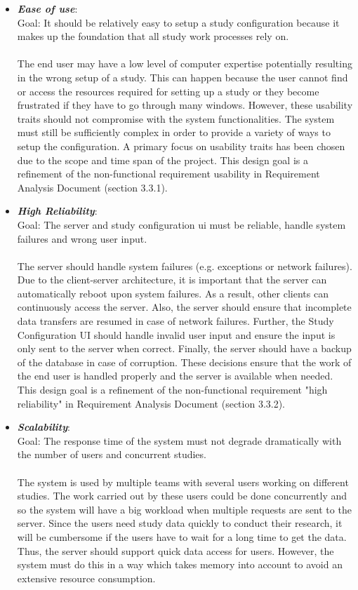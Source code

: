 \begin{itemize}
\item \textit{\bf{Ease of use}}: 
\\
Goal: It should be relatively easy to setup a study configuration because it makes up the foundation that all study work processes rely on. 
\\\\
The end user may have a low level of computer expertise potentially resulting in the wrong setup of a study.  This can happen because the user cannot find or access the resources required for setting up a study or they become frustrated if they have to go through many windows. However, these usability traits should not compromise with the system functionalities. The system must still be sufficiently complex in order to provide a variety of ways to setup the configuration.  A primary focus on usability traits has been chosen due to the scope and time span of the project. This design goal is a refinement of the non-functional requirement  usability in Requirement Analysis Document  (section 3.3.1). 

\item \textit{\bf{High Reliability}}: 
\\
Goal: The server and study configuration ui must be reliable, handle system failures and wrong user input.
\\\\
The server should handle system failures (e.g. exceptions or network failures). Due to the client-server architecture, it is important that the server can automatically reboot upon system failures. As a result, other clients can continuously access the server. Also, the server should ensure that incomplete data transfers are resumed in case of network failures. Further, the Study Configuration UI should handle invalid user input and ensure the input is only sent to the server when correct. Finally, the server should have a backup of the database in case of corruption. These decisions ensure that the work of the end user is handled properly and the server is available when needed. This design goal is a refinement of the non-functional requirement "high reliability" in Requirement Analysis Document (section 3.3.2).  

\item \textit{\bf{Scalability}}:
\\
Goal: The response time of the system must not degrade dramatically with the number of users and concurrent studies. 
\\\\
The system is used by multiple teams with several users working on different studies. The work carried out by these users could be done concurrently and so the system will have a big workload when multiple requests are sent to the server. Since the users need study data quickly to conduct their research, it will be cumbersome if the users have to wait for a long time to get the data. Thus, the server should support quick data access for users. However, the system must do this in a way which takes memory into account to avoid an extensive resource consumption.


\end{itemize}
